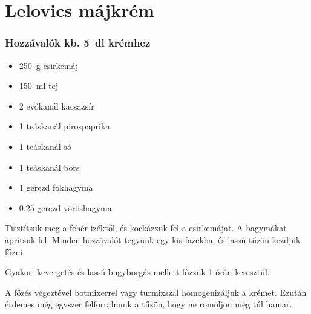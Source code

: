 \newpage
\section{Lelovics májkrém} \label{sec:majkrem}

\subsubsection*{Hozzávalók kb. \qty{5}{\deci\l} krémhez}
\begin{itemize}
    \item \qty{250}{\g} csirkemáj
    \item \qty{150}{\ml} tej
    \item \num{2} evőkanál kacsazsír
    \item \num{1} teáskanál pirospaprika
    \item \num{1} teáskanál só
    \item \num{1} teáskanál bors
    \item \num{1} gerezd fokhagyma
    \item \num{0.25} gerezd vöröshagyma
\end{itemize}

Tisztítsuk meg a fehér izéktől, és kockázzuk fel a csirkemájat. A hagymákat aprítsuk fel. Minden hozzávalót tegyünk egy kis fazékba, és lassú tűzön kezdjük főzni.

Gyakori kevergetés és lassú bugyborgás mellett főzzük 1 órán keresztül.

A főzés végeztével botmixerrel vagy turmixszal homogenizáljuk a krémet. Ezután érdemes még egyszer felforralnunk a tűzön, hogy ne romoljon meg túl hamar.
